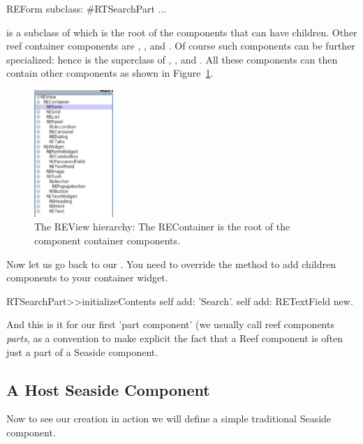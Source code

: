 \documentclass[a4paper,10pt,twoside]{book}
\begin{document}
\begin{code}{}
REForm subclass: #RTSearchPart
	...

\end{code}

 is a subclass of  which is the root of the components that can have children. Other reef container components are , , and . Of course such components can be further specialized: hence  is the superclass of , ,  and . All these components can then contain other components as shown in Figure~\ref{review}. 


\begin{figure}[h]
\begin{center}
\includegraphics[width=3cm]{REViewHierarchy}
\caption{The REView hierarchy: The REContainer is the root of the component container components.\label{review}}
\end{center}
\end{figure}


Now let us go back to our .  You need to override the method  to add children components to your container widget. 

\begin{code}{}
RTSearchPart>>initializeContents
	self add: 'Search'.
	self add: RETextField new.
\end{code}


And this is it for our first 'part component' (we usually call reef components \emph{parts}, as a convention to make explicit the fact that a Reef component is often just a part of a Seaside component.


\subsection{A Host Seaside Component}
Now to see our creation in action we will define a simple traditional Seaside component.
\end{document}
